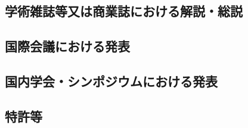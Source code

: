 \documentclass[11pt,a4paper,twoside,dvipdfmx]{jarticle}		%
\newcommand{\研究課題名}{象の卵}
\newcommand{\研究機関名}{逢坂大学}
\newcommand{\申請者氏名}{湯川秀樹}
\newcommand{\研究代表者氏名}{\申請者氏名}
\newcommand{\研究期間の最終元号年度}{34}	%
\begin{document}
\subsection{学術雑誌等又は商業誌における解説・総説}
\newcommand{\学術雑誌等または商業誌における解説や総説}{%
	\begin{enumerate}
		\item R.~Kipling, \underline{H. Yukawa},
				``The Elephant's Child (象の鼻はなぜ長い)'', 
				Nature, {\bf 999}, 777-779, (2003).
	\end{enumerate}
	他２件
}

\subsection{国際会議における発表}
\newcommand{\国際会議における発表}{%
	\begin{enumerate}
		\item $\circ$ 湯川秀樹、
			``Theory of Elephant Eggs'', 
			原始殻物理国際会議、
			カラチ、2006年2月

	\end{enumerate}
	他１件
}

\subsection{国内学会・シンポジウムにおける発表}
\newcommand{\国内学会やシンポジウムにおける発表}{%
	\begin{enumerate}
		\item $\circ$ 湯川秀樹、朝永振一郎、
			「ほ乳類の真の意味」、
			ほ乳類学会、
			東京、2003年6月
	\end{enumerate}
	他３件
}

\subsection{特許等}
\newcommand{\特許等}{%
	\begin{enumerate}
		\item[](公開中)
		\item 800800号、「クジラの卵を用いた深海潜水艇」\underline{湯川秀樹}、2003年4月
	\end{enumerate}		
}
\end{document}
